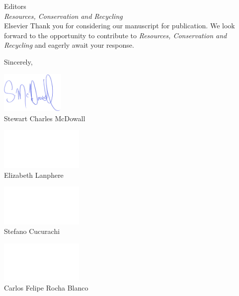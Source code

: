 \documentclass[10pt]{letter}
\begin{document}
\begin{letter}{Editors\\\textit{Resources, Conservation and Recycling}\\Elsevier}
Thank you for considering our manuscript for publication. We look forward to the opportunity to contribute to \textit{Resources, Conservation and Recycling} and eagerly await your response.

\vspace{1em}

\closing{Sincerely,}
\begin{center}
    \begin{minipage}[t]{0.25\textwidth}
      \centering
      \vspace{-2cm}
      \includegraphics[height=2cm]{signature_scm.png}\\ %
      Stewart Charles McDowall\\
    \end{minipage}%
    \begin{minipage}[t]{0.25\textwidth}
      \centering
      \vspace{-2cm}
      \includegraphics[height=2cm]{dummy_signature.png}\\ %
      Elizabeth Lanphere
    \end{minipage}%
    \begin{minipage}[t]{0.25\textwidth}
      \centering
      \vspace{-2cm}
      \includegraphics[height=2cm]{dummy_signature.png}\\ %
      Stefano Cucurachi
    \end{minipage}%
    \begin{minipage}[t]{0.25\textwidth}
      \centering
      \vspace{-2cm}
      \includegraphics[height=2cm]{dummy_signature.png}\\ %
      Carlos Felipe Rocha Blanco
    \end{minipage}
  \end{center}
  
\end{letter}
\end{document}
